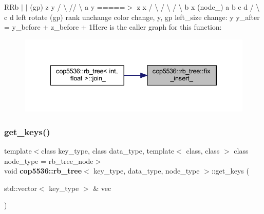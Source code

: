 R\+Rb $\vert$ $\vert$ (gp) z y / \textbackslash{} // \textbackslash{} a y =====$>$ z x / \textbackslash{} / \textbackslash{} / \textbackslash{} b x (node\+\_\+) a b c d / \textbackslash{} c d left rotate (gp) rank unchange color change, y, gp left\+\_\+size change\+: y y\+\_\+after = y\+\_\+before + z\+\_\+before + 1Here is the caller graph for this function\+:
\nopagebreak
\begin{figure}[H]
\begin{center}
\leavevmode
\includegraphics[width=334pt]{classcop5536_1_1rb__tree_a8c4eb96c329545e4056788be0511cd17_icgraph}
\end{center}
\end{figure}
\mbox{\label{classcop5536_1_1rb__tree_ac1b1dd54468fce3724d2e6b4205e0672}} 
\subsubsection{get\_keys()}
{\footnotesize\ttfamily template$<$class key\+\_\+type, class data\+\_\+type, template$<$ class, class $>$ class node\+\_\+type = rb\+\_\+tree\+\_\+node$>$ \\
void \textbf{ cop5536\+::rb\+\_\+tree}$<$ key\+\_\+type, data\+\_\+type, node\+\_\+type $>$\+::get\+\_\+keys (\begin{DoxyParamCaption}\item[{std\+::vector$<$ key\+\_\+type $>$ \&}]{vec }\end{DoxyParamCaption})\hspace{0.3cm}{\ttfamily [inline]}}

\mbox{\label{classcop5536_1_1rb__tree_aefd87c14dbf669cbd964b69112d1b553}} 

